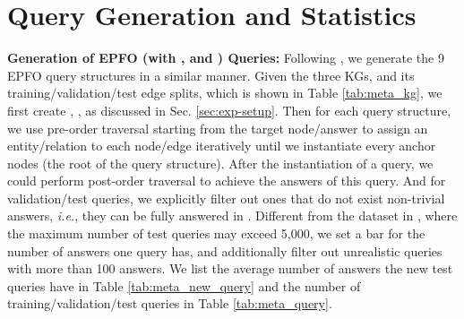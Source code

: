 \section{Query Generation and Statistics}\label{sec:query_generation}
\textbf{Generation of EPFO (with ,  and ) Queries:} Following \cite{ren2020query2box}, we generate the 9 EPFO query structures in a similar manner. Given the three KGs, and its training/validation/test edge splits, which is shown in Table \ref{tab:meta_kg}, we first create , ,  as discussed in Sec. \ref{sec:exp-setup}. Then for each query structure, we use pre-order traversal starting from the target node/answer to assign an entity/relation to each node/edge iteratively until we instantiate every anchor nodes (the root of the query structure). After the instantiation of a query, we could perform post-order traversal to achieve the answers of this query. And for validation/test queries, we explicitly filter out ones that do not exist non-trivial answers, \textit{i.e.}, they can be fully answered in . Different from the dataset in \cite{ren2020query2box}, where the maximum number of test queries may exceed 5,000, we set a bar for the number of answers one query has, and additionally filter out unrealistic queries with more than 100 answers. We list the average number of answers the new test queries have in Table \ref{tab:meta_new_query} and the number of training/validation/test queries in Table \ref{tab:meta_query}.

\begin{table*}[!h]
\centering
\small
{}
\caption{Knowledge graph dataset statistics as well as training, validation and test edge splits.}
\label{tab:meta_kg}
\end{table*}

